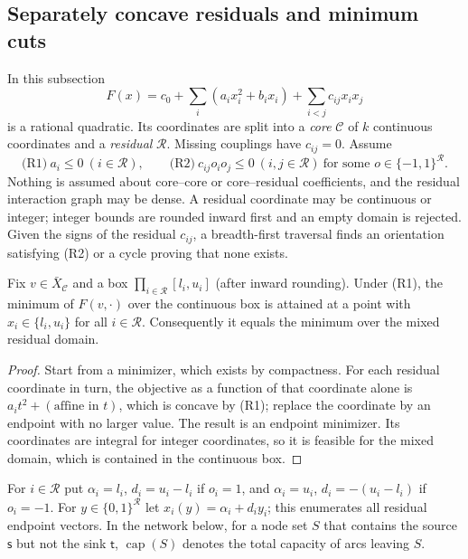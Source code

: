 \subsection{Separately concave residuals and minimum cuts}\label{sec:cuts}

In this subsection
\[
F(x)=c_0+\sum_i(a_ix_i^2+b_ix_i)+\sum_{i<j}c_{ij}x_ix_j
\]
is a rational quadratic. Its coordinates are split into a \emph{core}
$\mathcal C$ of $k$ continuous coordinates and a \emph{residual}
$\mathcal R$. Missing couplings have $c_{ij}=0$. Assume
\begin{equation}\label{eq:cr-class}
\text{(R1)}\ a_i\le0\ (i\in\mathcal R),\qquad
\text{(R2)}\ c_{ij}o_io_j\le0\ (i,j\in\mathcal R)\ \text{for some }
o\in\{-1,1\}^{\mathcal R}.
\end{equation}
Nothing is assumed about core--core or core--residual coefficients, and
the residual interaction graph may be dense. A residual coordinate may be
continuous or integer; integer bounds are rounded inward first and an
empty domain is rejected. Given the signs of the residual $c_{ij}$, a
breadth-first traversal finds an orientation satisfying (R2) or a cycle
proving that none exists.

\begin{lemma}\label{lem:cr-endpoint}
Fix $v\in\bar X_{\mathcal C}$ and a box $\prod_{i\in\mathcal R}[l_i,u_i]$
(after inward rounding). Under (R1), the minimum of $F(v,\cdot)$ over the
continuous box is attained at a point with $x_i\in\{l_i,u_i\}$ for all
$i\in\mathcal R$. Consequently it equals the minimum over the mixed
residual domain.
\end{lemma}
\begin{proof}
Start from a minimizer, which exists by compactness. For each residual
coordinate in turn, the objective as a function of that coordinate alone
is $a_it^2+(\text{affine in }t)$, which is concave by (R1); replace the
coordinate by an endpoint with no larger value. The result is an endpoint
minimizer. Its coordinates are integral for integer coordinates, so it is
feasible for the mixed domain, which is contained in the continuous box.
\end{proof}

For $i\in\mathcal R$ put $\alpha_i=l_i$, $d_i=u_i-l_i$ if $o_i=1$, and
$\alpha_i=u_i$, $d_i=-(u_i-l_i)$ if $o_i=-1$. For $y\in\{0,1\}^{\mathcal R}$
let $x_i(y)=\alpha_i+d_iy_i$; this enumerates all residual endpoint
vectors. In the network below, for a node set $S$ that contains the
source $\mathsf s$ but not the sink $\mathsf t$, $\operatorname{cap}(S)$
denotes the total capacity of arcs leaving $S$.

